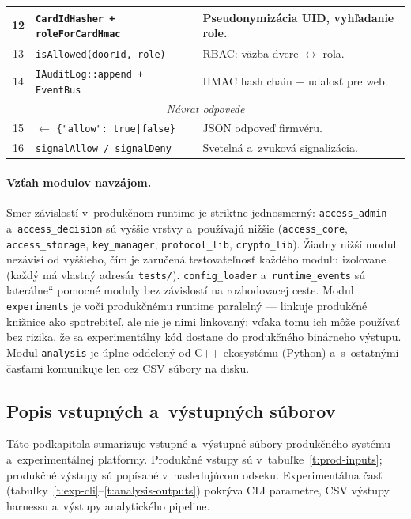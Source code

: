 \documentclass[a4paper]{feidipsp}
\providecommand{\uv}[1]{\quotedblbase#1\textquotedblleft}
\begin{document}
\begin{table}[!htbp]
\begin{tabular}{|c|l|p{5.5cm}|}
12 & \texttt{CardIdHasher + roleForCardHmac} & Pseudonymizácia UID, vyhľadanie role. \\ \hline
13 & \texttt{isAllowed(doorId, role)} & RBAC: väzba dvere $\leftrightarrow$ rola. \\ \hline
14 & \texttt{IAuditLog::append + EventBus} & HMAC hash chain + udalosť pre web. \\ \hline
\multicolumn{3}{|c|}{\emph{Návrat odpovede}} \\ \hline
15 & $\longleftarrow$ \texttt{\{"allow": true|false\}} & JSON odpoveď firmvéru. \\ \hline
16 & \texttt{signalAllow / signalDeny} & Svetelná a~zvuková signalizácia. \\ \hline
\end{tabular}
\end{table}

\paragraph{Vzťah modulov navzájom.}
Smer závislostí v~produkčnom runtime je striktne jednosmerný: \texttt{access\_admin} a~\texttt{access\_decision} sú vyššie vrstvy a~používajú nižšie (\texttt{access\_core}, \texttt{access\_storage}, \texttt{key\_manager}, \texttt{protocol\_lib}, \texttt{crypto\_lib}). Žiadny nižší modul nezávisí od vyššieho, čím je zaručená testovateľnosť každého modulu izolovane (každý má vlastný adresár \texttt{tests/}). \texttt{config\_loader} a~\texttt{runtime\_events} sú \uv{laterálne} pomocné moduly bez závislostí na rozhodovacej ceste. Modul \texttt{experiments} je voči produkčnému runtime paralelný --- linkuje produkčné knižnice ako spotrebiteľ, ale nie je nimi linkovaný; vďaka tomu ich môže používať bez rizika, že sa experimentálny kód dostane do produkčného binárneho výstupu. Modul \texttt{analysis} je úplne oddelený od C++ ekosystému (Python) a~s~ostatnými časťami komunikuje len cez CSV súbory na disku.

\subsection{Popis vstupných a~výstupných súborov}

Táto podkapitola sumarizuje vstupné a~výstupné súbory produkčného systému a~experimentálnej platformy. Produkčné vstupy sú v~tabuľke~\ref{t:prod-inputs}; produkčné výstupy sú popísané v~nasledujúcom odseku. Experimentálna časť (tabuľky~\ref{t:exp-cli}--\ref{t:analysis-outputs}) pokrýva CLI parametre, CSV výstupy harnessu a~výstupy analytického pipeline.
\end{document}
